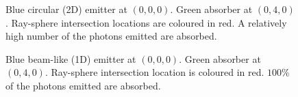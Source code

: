 \documentclass[12pt]{article}
\begin{document}
\begin{figure} 
\centering
{}
  \caption{
Blue circular (2D) emitter at $(0, 0, 0)$. 
Green absorber at $(0, 4, 0)$. 
Ray-sphere intersection locations are coloured in red.
A relatively high number of the photons emitted are absorbed.
}

\end{figure}

\begin{figure} 
\centering
{}
  \caption{
Blue beam-like (1D) emitter at $(0, 0, 0)$. 
Green absorber at $(0, 4, 0)$. 
Ray-sphere intersection location is coloured in red.
$100\%$ of the photons emitted are absorbed.
}
\end{figure}
\end{document}
